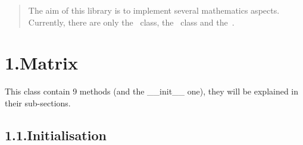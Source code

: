 \documentclass[10pt]{article}
\begin{document}
\mdxtitleblockstart{}

\mdxauthorstart{}


\mdxauthorend\mdtitleauthorrunning{}{}\mdxtitleblockend%

\begin{abstract}%

\noindent{}The aim of this library is to implement several mathematics aspects.
Currently, there are only the~ class, the~ class and the~.%
\end{abstract}%

\section{1.\hspace*{0.5em}Matrix}\label{sec-matrix}%

\noindent{}This class contain 9 methods (and the \_\_init\_\_ one), they will be explained in their sub-sections.%

\subsection{1.1.\hspace*{0.5em}Initialisation}\label{sec-initialisation}%
\end{document}
